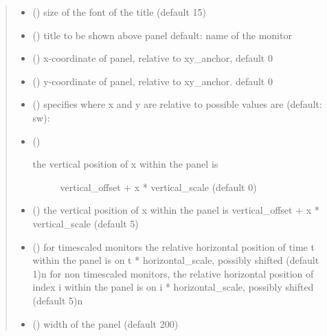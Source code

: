 \documentclass[letterpaper,10pt,english]{sphinxmanual}
\begin{document}
\begin{fulllineitems}
\begin{quote}
\begin{description}
\begin{itemize}
\item {} 
 () \textendash{} size of the font of the title (default 15)

\item {} 
 () \textendash{} title to be shown above panel 
default: name of the monitor

\item {} 
 () \textendash{} x-coordinate of panel, relative to xy\_anchor, default 0

\item {} 
 () \textendash{} y-coordinate of panel, relative to xy\_anchor. default 0

\item {} 
 () \textendash{} specifies where x and y are relative to 
possible values are (default: sw): 

\item {} 
 () \textendash{} \begin{description}
\item[{the vertical position of x within the panel is}] \leavevmode
vertical\_offset + x * vertical\_scale (default 0)

\end{description}


\item {} 
 () \textendash{} the vertical position of x within the panel is
vertical\_offset + x * vertical\_scale (default 5)

\item {} 
 () \textendash{} for timescaled monitors the relative horizontal position of time t within the panel is on
t * horizontal\_scale, possibly shifted (default 1)\textbar{}n\textbar{}
for non timescaled monitors, the relative horizontal position of index i within the panel is on
i * horizontal\_scale, possibly shifted (default 5)\textbar{}n\textbar{}

\item {} 
 () \textendash{} width of the panel (default 200)


\end{itemize}
\end{description}
\end{quote}
\end{fulllineitems}
\end{document}
